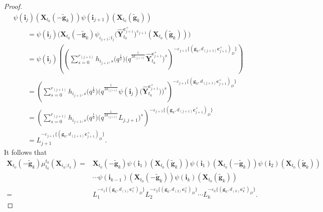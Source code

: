 \documentclass[11pt]{article}
\numberwithin{equation}{section}
\numberwithin{equation}{section}
\begin{document}
\begin{proof}
\begin{gather*}
  \psi(\mathbf{i}_{j})(\mathbf{X}_{t_{0}}(-\mathbf{\tilde{g}}_{k}))\psi(\mathbf{i}_{j+1})(\mathbf{X}_{t_{0}}(\mathbf{\tilde{g}}_{k}))\\
  \qquad=\psi(\mathbf{i}_{j})\bigl(\mathbf{X}_{t_{0}}(-\mathbf{\tilde{g}}_{k})\psi_{i_{j+1};t_{j}}\bigl(\mathbf{\hat{Y}}_{t_0}^{\mathbf{c}_{j+1}^+}\bigr)^{\varepsilon_{j+1}}
  (\mathbf{X}_{t_{0}}(\mathbf{\tilde{g}}_{k}))\bigr)\\
 \qquad  =\psi(\mathbf{i}_{j})\left(\left(\sum\limits^{r_{(j+1)}}_{s=0}h_{i_{j+1},s}\bigl(q^{\frac{1}{2}}\bigr)
 \bigl(q^{\frac{1}{2d_{(j+1)}}}\mathbf{\hat{Y}}_{t_{0}}^{\mathbf{c}_{j+1}^{+}}\bigr)^{s}\right)
 ^{-\varepsilon_{j+1}\{(\mathbf{g}_{k},d_{(j+1)}\mathbf{c}_{j+1}^{+})_{D}\}}\right)\\
\qquad  =\left(\sum\limits^{r_{(j+1)}}_{s=0}h_{i_{j+1},s}\bigl(q^{\frac{1}{2}}\bigr)\bigl(q^{\frac{1}{2d_{(j+1)}}}\psi(\mathbf{i}_{j})\bigl(\mathbf{\hat{Y}}_{t_{0}}^{\mathbf{c}_{j+1}^{+}}\bigr)\bigr)^{s}\right)^{-\varepsilon_{j+1}\{(\mathbf{g}_{k},d_{(j+1)}\mathbf{c}_{j+1}^{+})_{D}\}}\\
\qquad  =\left(\sum\limits^{r_{(j+1)}}_{s=0}h_{i_{j+1},s}\bigl(q^{\frac{1}{2}}\bigr)\bigl(q^{\frac{1}{2d_{(j+1)}}}L_{j,j+1}\bigr)^{s}\right)^{-\varepsilon_{j+1}\{(\mathbf{g}_{k},d_{(j+1)}\mathbf{c}_{j+1}^{+})_{D}\}}\\
\qquad  =L_{j+1}^{-\varepsilon_{j+1}\{(\mathbf{g}_{k},d_{(j+1)}\mathbf{c}_{j+1}^{+})_{D}\}}.
 \end{gather*}
 It follows that
 \begin{align*}
 \mathbf{X}_{t_{0}}(-\mathbf{\tilde{g}}_{k})\mu_{t_{k}}^{t_{0}}(\mathbf{X}_{i_{k};t_{k}})
 ={}&\mathbf{X}_{t_{0}}(-\mathbf{\tilde{g}}_{k})\psi(\mathbf{i}_{1})(\mathbf{X}_{t_{0}}(\mathbf{\tilde{g}}_{k}))\psi(\mathbf{i}_{1})(\mathbf{X}_{t_{0}}(-\mathbf{\tilde{g}}_{k}))\psi(\mathbf{i}_{2})(\mathbf{X}_{t_{0}}(\mathbf{\tilde{g}}_{k}))\\
 &\cdots\psi(\mathbf{i}_{k-1})(\mathbf{X}_{t_{0}}(-\mathbf{\tilde{g}}_{k}))\psi(\mathbf{i}_{k})(\mathbf{X}_{t_{0}}(\mathbf{\tilde{g}}_{k}))\\
 ={}&L_{1}^{-\varepsilon_{1}\{(\mathbf{g}_{k},d_{(1)}\mathbf{c}_{1}^{+})_{D}\}}L_{2}^{-\varepsilon_{2}\{(\mathbf{g}_{k},d_{(2)}\mathbf{c}_{2}^{+})_{D}\}}\cdots L_{k}^{-\varepsilon_{k}\{(\mathbf{g}_{k},d_{(k)}\mathbf{c}_{k}^{+})_{D}\}}.\tag*{\qed}
 \end{align*}\renewcommand{\qed}{}
\end{proof}
\end{document}
